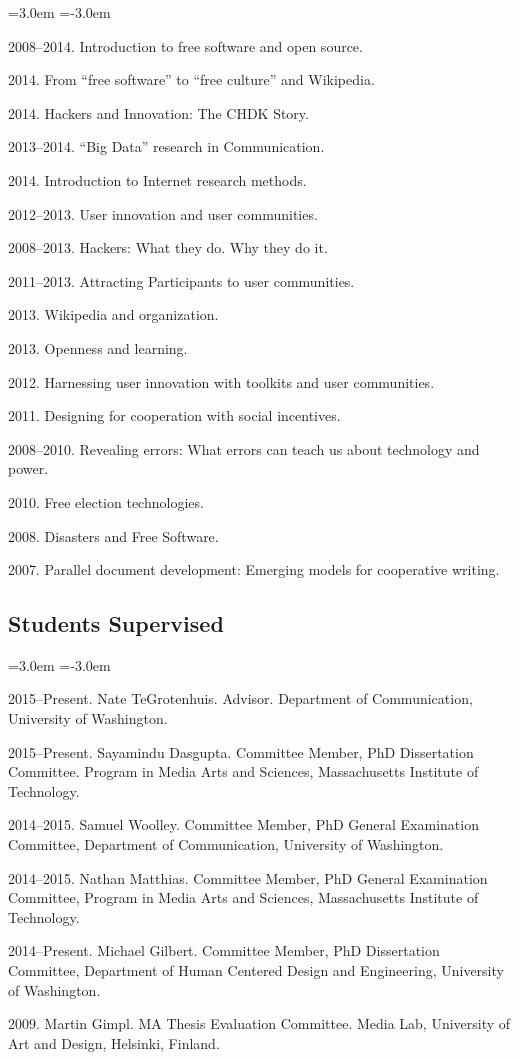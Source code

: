 \documentclass[10pt]{article}
\newenvironment{cvlist}{
\begin{list}{}{\leftmargin=3.0em \itemindent=-3.0em}
  \setlength{\itemsep}{0pt}
  \setlength{\parskip}{0em}
  \setlength{\parsep}{1em}
  \setlength{\parindent}{0em}}
{\vspace{1em}
\end{list}}
\begin{document}
\begin{cvlist}

\item 2008--2014. Introduction to free software and open source.
\item 2014. From ``free software'' to ``free culture'' and Wikipedia.
\item 2014. Hackers and Innovation: The CHDK Story.
\item 2013--2014. ``Big Data'' research in Communication.
\item 2014. Introduction to Internet research methods.
\item 2012--2013. User innovation and user communities.
\item 2008--2013. Hackers: What they do. Why they do it.
\item 2011--2013. Attracting Participants to user communities.
\item 2013. Wikipedia and organization.
\item 2013. Openness and learning.
\item 2012. Harnessing user innovation with toolkits and user communities.
\item 2011. Designing for cooperation with social incentives.
\item 2008--2010. Revealing errors: What errors can teach us about technology and power.
\item 2010. Free election technologies.
\item 2008. Disasters and Free Software.
\item 2007. Parallel document development: Emerging models for cooperative writing.
\end{cvlist}

\subsection{Students Supervised}

\begin{cvlist}
\item 2015--Present. Nate TeGrotenhuis. Advisor. Department of Communication, University of Washington.
\item 2015--Present. Sayamindu Dasgupta. Committee Member, PhD Dissertation Committee. Program in Media Arts and Sciences, Massachusetts Institute of Technology.
\item 2014--2015. Samuel Woolley. Committee Member, PhD General Examination Committee, Department of Communication, University of Washington.
\item 2014--2015. Nathan Matthias. Committee Member, PhD General Examination Committee, Program in Media Arts and Sciences, Massachusetts Institute of Technology.
\item 2014--Present. Michael Gilbert. Committee Member, PhD Dissertation Committee, Department of Human Centered Design and Engineering, University of Washington.
\item 2009. Martin Gimpl. MA Thesis Evaluation Committee. Media Lab, University of Art and Design, Helsinki, Finland.
\end{cvlist}
\end{document}
